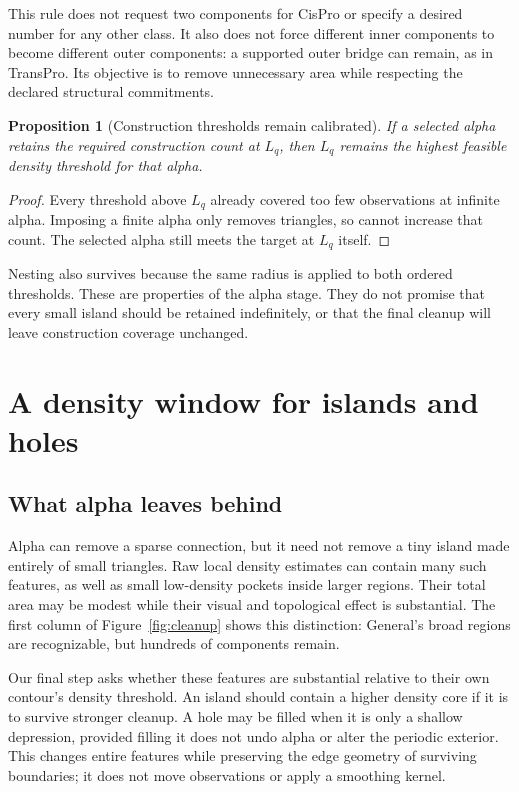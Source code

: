 \documentclass[11pt]{article}
\newtheorem{proposition}{Proposition}
\begin{document}
This rule does not request two components for CisPro or specify a desired
number for any other class. It also does not force different inner
components to become different outer components: a supported outer bridge
can remain, as in TransPro. Its objective is to remove unnecessary area
while respecting the declared structural commitments.

\begin{proposition}[Construction thresholds remain calibrated]
If a selected alpha retains the required construction count at $L_q$, then
$L_q$ remains the highest feasible density threshold for that alpha.
\end{proposition}
\begin{proof}
Every threshold above $L_q$ already covered too few observations at infinite
alpha. Imposing a finite alpha only removes triangles, so cannot increase
that count. The selected alpha still meets the target at $L_q$ itself.
\end{proof}

Nesting also survives because the same radius is applied to both ordered
thresholds. These are properties of the alpha stage. They do not promise
that every small island should be retained indefinitely, or that the final
cleanup will leave construction coverage unchanged.

\section{A density window for islands and holes}
\label{sec:cleanup}

\subsection{What alpha leaves behind}

Alpha can remove a sparse connection, but it need not remove a tiny island
made entirely of small triangles. Raw local density estimates can contain
many such features, as well as small low-density pockets inside larger
regions. Their total area may be modest while their visual and topological
effect is substantial. The first column of Figure~\ref{fig:cleanup} shows
this distinction: General's broad regions are recognizable, but hundreds
of components remain.

Our final step asks whether these features are substantial relative to
their own contour's density threshold. An island should contain a higher
density core if it is to survive stronger cleanup. A hole may be filled
when it is only a shallow depression, provided filling it does not undo
alpha or alter the periodic exterior. This changes entire features while
preserving the edge geometry of surviving boundaries; it does not move
observations or apply a smoothing kernel.
\end{document}

